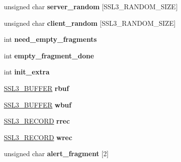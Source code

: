 \begin{DoxyCompactItemize}
\item 
\mbox{\label{structssl3__state__st_ae0e0d20a2153469e1f0ee40b5852392b}} 
unsigned char {\bfseries server\+\_\+random} \mbox{[}S\+S\+L3\+\_\+\+R\+A\+N\+D\+O\+M\+\_\+\+S\+I\+ZE\mbox{]}
\item 
\mbox{\label{structssl3__state__st_a08ccdbf1359a0d714bb7c1934dc3e7d4}} 
unsigned char {\bfseries client\+\_\+random} \mbox{[}S\+S\+L3\+\_\+\+R\+A\+N\+D\+O\+M\+\_\+\+S\+I\+ZE\mbox{]}
\item 
\mbox{\label{structssl3__state__st_aa7dc2c2f9d03ff717c3aef1051784357}} 
int {\bfseries need\+\_\+empty\+\_\+fragments}
\item 
\mbox{\label{structssl3__state__st_a97e5546af9e51f39f4a6c9f7b73ba1b1}} 
int {\bfseries empty\+\_\+fragment\+\_\+done}
\item 
\mbox{\label{structssl3__state__st_ac744a39f9703118ad914799059630a70}} 
int {\bfseries init\+\_\+extra}
\item 
\mbox{\label{structssl3__state__st_afe5098e88b32cad3b79243f2b53f6040}} 
\hyperlink{structssl3__buffer__st}{S\+S\+L3\+\_\+\+B\+U\+F\+F\+ER} {\bfseries rbuf}
\item 
\mbox{\label{structssl3__state__st_a96b970880608f297b54db97424330be3}} 
\hyperlink{structssl3__buffer__st}{S\+S\+L3\+\_\+\+B\+U\+F\+F\+ER} {\bfseries wbuf}
\item 
\mbox{\label{structssl3__state__st_affde905dbcf7ece7aab929f37ffe043a}} 
\hyperlink{structssl3__record__st}{S\+S\+L3\+\_\+\+R\+E\+C\+O\+RD} {\bfseries rrec}
\item 
\mbox{\label{structssl3__state__st_ab3e2700e58172be629db1f2af7ef510a}} 
\hyperlink{structssl3__record__st}{S\+S\+L3\+\_\+\+R\+E\+C\+O\+RD} {\bfseries wrec}
\item 
\mbox{\label{structssl3__state__st_ac5746677681e98a0ca4e3fb0551dd1df}} 
unsigned char {\bfseries alert\+\_\+fragment} \mbox{[}2\mbox{]}

\end{DoxyCompactItemize}
